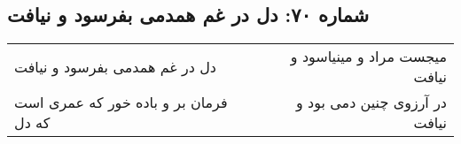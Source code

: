 \begin{center}
\section*{شماره ۷۰: دل در غم همدمی بفرسود و نیافت}
\label{sec:070}
\begin{longtable}{l p{0.5cm} r}
دل در غم همدمی بفرسود و نیافت
&&
میجست مراد و مینیاسود و نیافت
\\
فرمان بر و باده خور که عمری است که دل
&&
در آرزوی چنین دمی بود و نیافت
\\
\end{longtable}
\end{center}
